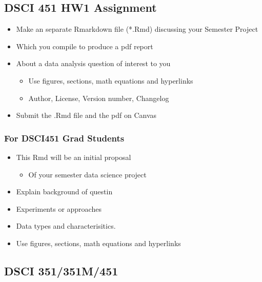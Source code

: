 \documentclass[]{article}
\providecommand{\tightlist}{%
  \setlength{\itemsep}{0pt}\setlength{\parskip}{0pt}}
\begin{document}
\hypertarget{dsci-451-hw1-assignment}{%
\subsection{DSCI 451 HW1 Assignment}\label{dsci-451-hw1-assignment}}

\begin{itemize}
\tightlist
\item
  Make an separate Rmarkdown file (*.Rmd) discussing your Semester
  Project
\item
  Which you compile to produce a pdf report
\item
  About a data analysis question of interest to you

  \begin{itemize}
  \tightlist
  \item
    Use figures, sections, math equations and hyperlinks
  \item
    Author, License, Version number, Changelog
  \end{itemize}
\item
  Submit the .Rmd file and the pdf on Canvas
\end{itemize}

\hypertarget{for-dsci451-grad-students}{%
\subsubsection{For DSCI451 Grad
Students}\label{for-dsci451-grad-students}}

\begin{itemize}
\tightlist
\item
  This Rmd will be an initial proposal

  \begin{itemize}
  \tightlist
  \item
    Of your semester data science project
  \end{itemize}
\item
  Explain background of questin
\item
  Experiments or approaches
\item
  Data types and characterisitics.
\item
  Use figures, sections, math equations and hyperlinks
\end{itemize}

\hypertarget{dsci-351351m451}{%
\subsection{DSCI 351/351M/451}\label{dsci-351351m451}}
\end{document}
